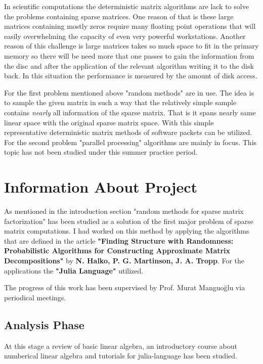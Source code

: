 \documentclass[11pt,a4paper]{article}
\theoremstyle{definition}
\begin{document}
		In scientific computations the deterministic matrix algorithms are lack to solve the problems containing sparse matrices. One reason of that is these large matrices containing mostly zeros require many floating point operations that will easily overwhelming the capacity of even very powerful workstations.  Another reason of this challenge is large matrices takes so much space to fit in the primary memory so there will be need more that one passes to gain the information from the disc and after the application of the relevant algorithm writing it to the disk back. In this situation the performance is measured by the amount of disk access.
		
		For the first problem mentioned above "random methods" are in use. The idea is to sample the given matrix in such a way that the relatively simple sample contains \textit{nearly} all information of the sparse matrix. That is it spans nearly same linear space with the original sparse matrix space. With this simple representative deterministic matrix methods of software packets can be utilized. For the second problem "parallel processing" algorithms are mainly in focus. This topic has not been studied under this summer practice period.
		
	\section{Information About Project}
	
	As mentioned in the introduction section "random methods for sparse matrix factorization" has been studied as a solution of the first major problem of sparse matrix computations. I had worked on this method by applying the algorithms that are defined in the article \textbf{"Finding Structure with Randomness: Probabilistic Algorithms for Constructing Approximate Matrix Decompositions"} by \textbf{N. Halko, P. G. Martinson, J. A. Tropp}. For the applications the \textbf{"Julia Language"} utilized.
	
	The progress of this work has been supervised by Prof. Murat Manguoğlu via periodical meetings. 
	
	\subsection{Analysis Phase}
	At this stage a review of basic linear algebra, an introductory course about numberical linear algebra and tutorials for julia-language has been studied.		
\end{document}
